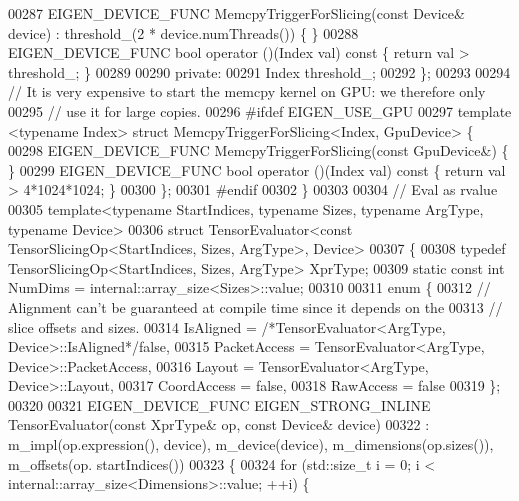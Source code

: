 \begin{DoxyCode}
00287   EIGEN\_DEVICE\_FUNC MemcpyTriggerForSlicing(\textcolor{keyword}{const} Device& device) : threshold\_(2 * device.numThreads()) \{ \}
00288   EIGEN\_DEVICE\_FUNC \textcolor{keywordtype}{bool} operator ()(Index val)\textcolor{keyword}{ const }\{ \textcolor{keywordflow}{return} val > threshold\_; \}
00289 
00290  \textcolor{keyword}{private}:
00291   Index threshold\_;
00292 \};
00293 
00294 \textcolor{comment}{// It is very expensive to start the memcpy kernel on GPU: we therefore only}
00295 \textcolor{comment}{// use it for large copies.}
00296 \textcolor{preprocessor}{#ifdef EIGEN\_USE\_GPU}
00297 \textcolor{keyword}{template} <\textcolor{keyword}{typename} Index> \textcolor{keyword}{struct }MemcpyTriggerForSlicing<Index, GpuDevice>  \{
00298   EIGEN\_DEVICE\_FUNC MemcpyTriggerForSlicing(\textcolor{keyword}{const} GpuDevice&) \{ \}
00299   EIGEN\_DEVICE\_FUNC \textcolor{keywordtype}{bool} operator ()(Index val)\textcolor{keyword}{ const }\{ \textcolor{keywordflow}{return} val > 4*1024*1024; \}
00300 \};
00301 \textcolor{preprocessor}{#endif}
00302 \}
00303 
00304 \textcolor{comment}{// Eval as rvalue}
00305 \textcolor{keyword}{template}<\textcolor{keyword}{typename} StartIndices, \textcolor{keyword}{typename} Sizes, \textcolor{keyword}{typename} ArgType, \textcolor{keyword}{typename} Device>
00306 \textcolor{keyword}{struct }TensorEvaluator<const TensorSlicingOp<StartIndices, Sizes, ArgType>, Device>
00307 \{
00308   \textcolor{keyword}{typedef} TensorSlicingOp<StartIndices, Sizes, ArgType> XprType;
00309   \textcolor{keyword}{static} \textcolor{keyword}{const} \textcolor{keywordtype}{int} NumDims = internal::array\_size<Sizes>::value;
00310 
00311   \textcolor{keyword}{enum} \{
00312     \textcolor{comment}{// Alignment can't be guaranteed at compile time since it depends on the}
00313     \textcolor{comment}{// slice offsets and sizes.}
00314     IsAligned = \textcolor{comment}{/*TensorEvaluator<ArgType, Device>::IsAligned*/}\textcolor{keyword}{false},
00315     PacketAccess = TensorEvaluator<ArgType, Device>::PacketAccess,
00316     Layout = TensorEvaluator<ArgType, Device>::Layout,
00317     CoordAccess = \textcolor{keyword}{false},
00318     RawAccess = \textcolor{keyword}{false}
00319   \};
00320 
00321   EIGEN\_DEVICE\_FUNC EIGEN\_STRONG\_INLINE TensorEvaluator(\textcolor{keyword}{const} XprType& op, \textcolor{keyword}{const} Device& device)
00322       : m\_impl(op.expression(), device), m\_device(device), m\_dimensions(op.sizes()), m\_offsets(op.
      startIndices())
00323   \{
00324     \textcolor{keywordflow}{for} (std::size\_t i = 0; i < internal::array\_size<Dimensions>::value; ++i) \{

\end{DoxyCode}
